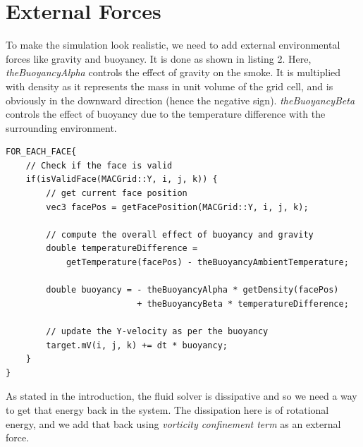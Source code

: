\documentclass[a4paper,11pt]{article}
\theoremstyle{mytheor}
\begin{document}
\section*{External Forces}

To make the simulation look realistic, we need to add external environmental forces like gravity and buoyancy. It is done as shown in listing 2. Here, \textit{theBuoyancyAlpha} controls the effect of gravity on the smoke. It is multiplied with density as it represents the mass in unit volume of the grid cell, and is obviously in the downward direction (hence the negative sign). \textit{theBuoyancyBeta} controls the effect of buoyancy due to the temperature difference with the surrounding environment.

\begin{lstlisting}[label={list:second},caption= Buoyancy and Gravity]
FOR_EACH_FACE{
    // Check if the face is valid
    if(isValidFace(MACGrid::Y, i, j, k)) {
        // get current face position
        vec3 facePos = getFacePosition(MACGrid::Y, i, j, k);
        
        // compute the overall effect of buoyancy and gravity
        double temperatureDifference = 
            getTemperature(facePos) - theBuoyancyAmbientTemperature;
            
        double buoyancy = - theBuoyancyAlpha * getDensity(facePos) 
                          + theBuoyancyBeta * temperatureDifference;
                          
        // update the Y-velocity as per the buoyancy
        target.mV(i, j, k) += dt * buoyancy;
    }
}
\end{lstlisting}

\par
\noindent
As stated in the introduction, the fluid solver is dissipative and so we need a way to get that energy back in the system. The dissipation here is of rotational energy, and we add that back using \textit{vorticity confinement term} as an external force. 
\end{document}
